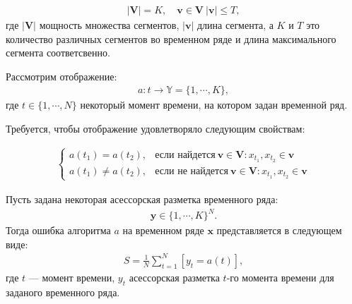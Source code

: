 \documentclass[12pt, twoside]{article}
\numberwithin{equation}{section}
\begin{document}
\begin{equation}
\label{eq:st:3}
\begin{aligned}
\left|\mathbf{V}\right| = K, \quad \textbf{v} \in \mathbf{V}~\left|\textbf{v}\right| \leq T,
\end{aligned}
\end{equation}
где $\left|\mathbf{V}\right|$ мощность множества сегментов, $\left|\textbf{v}\right|$ длина сегмента, а $K$ и $T$ это количество различных сегментов во временном ряде и длина максимального сегмента соответсвенно.

Рассмотрим отображение:
\begin{equation}
\label{eq:st:4}
\begin{aligned}
a : t \to \mathbb{Y} = \{1,\cdots, K\}, 
\end{aligned}
\end{equation}
где $t \in \{1,\cdots, N\}$ некоторый момент времени, на котором задан временной ряд.

Требуется, чтобы отображение удовлетворяло следующим свойствам:

\begin{equation}
\label{eq:st:5}
\begin{aligned}
\begin{cases}
    a\left(t_1\right) = a\left(t_2\right), & \text{если найдется}~\textbf{v} \in \mathbf{V}: x_{t_1},x_{t_2} \in \textbf{v}\\
    a\left(t_1\right) \not= a\left(t_2\right), & \text{если не найдется}~\textbf{v} \in \mathbf{V}: x_{t_1},x_{t_2} \in \textbf{v}
\end{cases}
\end{aligned}
\end{equation}

Пусть задана некоторая асессорская разметка временного ряда:
\begin{equation}
\label{eq:st:6}
\begin{aligned}
\textbf{y} \in \{1,\cdots,K\}^{N}.
\end{aligned}
\end{equation}
Тогда ошибка алгоритма $a$ на временном ряде $\textbf{x}$ представляется в следующем виде:
\begin{equation}
\label{eq:st:7}
\begin{aligned}
S = \frac{1}{N}\sum_{t=1}^{N}[y_t = a\left(t\right)],
\end{aligned}
\end{equation}
где $t$ --- момент времени,  $y_t$ асессорская разметка $t$-го момента времени для заданого временного ряда.
\end{document}
